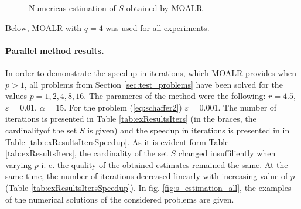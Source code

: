 \documentclass{llncs}
\begin{document}
\begin{figure}[ht]
    \centering
    \caption{Numericas estimation of \(S\) obtained by MOALR}
    \label{fig:fonseca_slater}
\end{figure}

Below, MOALR with \(q=4\) was used for all experiments.

\paragraph{Parallel method results.} In order to demonstrate the speedup in iterations, which
MOALR provides when \(p > 1\), all problems from Section \ref{sec:test_problems} have been
solved for the values \(p=1,2,4,8,16\). The parameres of the method were the following:
\(r=4.5\), \(\varepsilon=0.01\), \(\alpha=15\). For the problem (\ref{eq:schaffer2})
\(\varepsilon=0.001\). The number of iterations is presented in Table \ref{tab:exResultsIters}
(in the braces, the cardinalityof the set \(S\) is given) and the speedup in iterations is presented
in in Table \ref{tab:exResultsItersSpeedup}. As it is evident form Table
\ref{tab:exResultsIters}, the cardinality of the set \(S\) changed insuffiliently when varying \(p\)
i. e. the quality of the obtained estimates remained the same. At the same time, the number of
iterations decreased linearly with increasing value of \(p\) (Table
\ref{tab:exResultsItersSpeedup}). In fig. \ref{fig:s_estimation_all}, the examples of the
numerical solutions of the considered problems are given.
\end{document}

